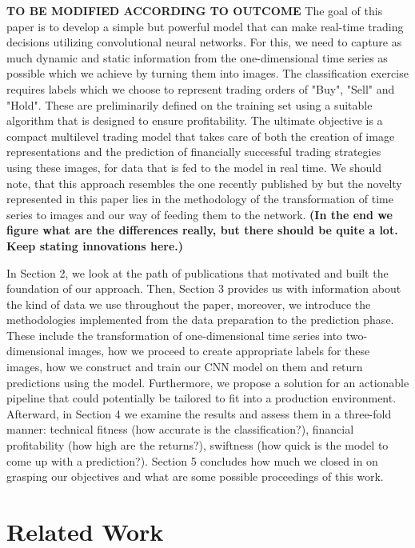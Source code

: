 \documentclass[11pt, a4paper]{article}
\begin{document}
\textbf{TO BE MODIFIED ACCORDING TO OUTCOME}
The goal of this paper is to develop a simple but powerful model that can make real-time trading decisions utilizing convolutional neural networks. For this, we need to capture as much dynamic 
and static information from the one-dimensional time series as possible which we achieve by turning them into images. The classification exercise requires labels which we choose to represent 
trading orders of "Buy", "Sell" and "Hold". 
These are preliminarily defined on the training set using a suitable algorithm that is designed to ensure profitability. The ultimate objective is a compact multilevel trading model that takes care of both the creation 
of image representations and the prediction of financially successful trading strategies using these images, for data that is fed to the model in real time. 
We should note, that this approach resembles the one recently published by \cite{sezer2018algorithmic} but the novelty represented in this paper lies in the methodology of 
the transformation of time series to images and our way of feeding them to the network. \textbf{(In the end we figure what are the differences really, but there should be quite a lot.
Keep stating innovations here.)}

In Section 2, we look at the path of publications that motivated and built the foundation of our approach. Then, Section 3 provides us with information about the kind of data we use throughout 
the paper, moreover, we introduce the methodologies implemented from the data preparation to the prediction phase. These include the transformation of one-dimensional time series into two-dimensional images, 
how we proceed to create appropriate labels for these images, how we construct and train our CNN model on them and return predictions using the model. Furthermore, we propose a solution for an 
actionable pipeline that could potentially be tailored to fit into a production environment.
Afterward, in Section 4 we examine the results and assess them in a three-fold manner:
technical fitness (how accurate is the classification?), financial profitability (how high are the returns?), swiftness (how quick is the model to come up with a prediction?). Section 5 concludes how much 
we closed in on grasping our objectives and what are some possible proceedings of this work.

\section{Related Work}
\end{document}
